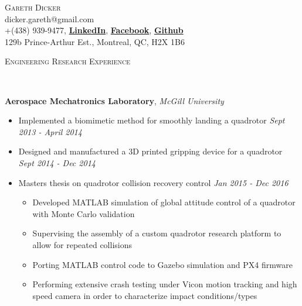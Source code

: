 \documentclass[9pt]{article}
\newenvironment{changemargin}[2]{%
  \begin{list}{}{%
    \setlength{\topsep}{0pt}%
    \setlength{\leftmargin}{#1}%
    \setlength{\rightmargin}{#2}%
    \setlength{\listparindent}{\parindent}%
    \setlength{\itemindent}{\parindent}%
    \setlength{\parsep}{\parskip}%
  }%
  \item[]}{\end{list}
}
\newcommand{\lineover}{
	\begin{changemargin}{-0.05in}{-0.05in}
		\vspace*{-8pt}
		\hrulefill \\
		\vspace*{-2pt}
	\end{changemargin}
}
\newcommand{\header}[1]{
	\begin{changemargin}{-0.5in}{-0.5in}
		\scshape{#1}\\
  	\lineover
	\end{changemargin}
}
\newcommand{\contact}[4]{
	\begin{changemargin}{-0.5in}{-0.5in}
		\begin{center}
			{\Large \scshape {#1}}\\ \smallskip
			{#2}\\ \smallskip 
			{#3}\\ \smallskip
			{#4}\smallskip
		\end{center}
	\end{changemargin}
}
\newenvironment{body} {
	\vspace*{-16pt}
	\begin{changemargin}{-0.25in}{-0.5in}
  }	
	{\end{changemargin}
}
\begin{document}
\contact{Gareth Dicker}{dicker.gareth@gmail.com}{+(438) 939-9477, \href{https://www.linkedin.com/in/gareth-dicker-46b98774}{\textbf{LinkedIn}}, \href{https://www.facebook.com/gareth.dicker.5}{\textbf{Facebook}}, \href{https://github.com/McGill-AML/Collision}{\textbf{Github}}}{129b Prince-Arthur Est., Montreal, QC, H2X 1B6}

\bigskip


\header{Engineering Research Experience}

\begin{body}
	\vspace{14pt}
	\textbf{Aerospace Mechatronics Laboratory}, \emph{McGill University}
	\vspace*{-4pt}
	\begin{itemize} \itemsep -0pt  %
		\item Implemented a biomimetic method for smoothly landing a quadrotor \hfill \emph{Sept 2013 - April 2014}\\
		
		\item Designed and manufactured a 3D printed gripping device for a quadrotor \hfill \emph{Sept 2014 - Dec 2014}\\
		
		\item Masters thesis on quadrotor collision recovery control \hfill \emph{Jan 2015 - Dec 2016}\\
		
		\begin{itemize}
		    \item Developed MATLAB simulation of global attitude control of a quadrotor with Monte Carlo validation 
		    \item Supervising the assembly of a custom quadrotor research platform to allow for repeated collisions
		    \item Porting MATLAB control code to Gazebo simulation and PX4 firmware
		    \item Performing extensive crash testing under Vicon motion tracking and high speed camera in order to characterize impact conditions/types
		\end{itemize}
		
	\end{itemize}
\end{body}
\medskip
\end{document}
